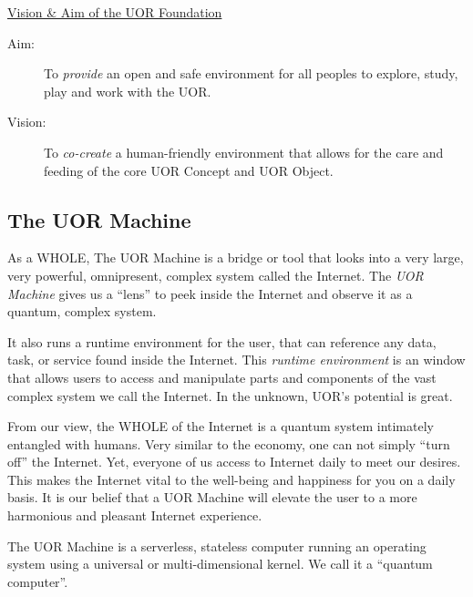 \documentclass[twocolumn,10pt]{article}
\begin{document}
\vspace{20pt}
\begin{minipage}{0.95\linewidth}
    \begin{tcolorbox}
    \begin{center}\underline{Vision \& Aim of the UOR Foundation}\end{center}
        \begin{description}
            \item[Aim:] To \textit{provide} an open and safe environment for all peoples to explore, study, play and work with the UOR\@. 
            \item[Vision:] To \textit{co-create} a human-friendly environment that allows for the care and feeding of the core UOR Concept and UOR Object. 
        \end{description}
    \end{tcolorbox}
\end{minipage}
\vspace{10pt}

\subsection*{The UOR Machine}
As a WHOLE, The UOR Machine is a bridge or tool that looks into a very large, very powerful, omnipresent, complex system called the Internet.
The \textit{UOR Machine} gives us a ``lens'' to peek inside the Internet and observe it as a quantum, complex system.

It also runs a runtime environment for the user, that can reference any data, task, or service found inside the Internet.
This \textit{runtime environment} is an window that allows users to access and manipulate parts and components of the vast complex system we call the Internet.
In the unknown, UOR's potential is great.

From our view, the WHOLE of the Internet is a quantum system intimately entangled with humans.
Very similar to the economy, one can not simply ``turn off'' the Internet.
Yet, everyone of us access to Internet daily to meet our desires.
This makes the Internet vital to the well-being and happiness for you on a daily basis.
It is our belief that a UOR Machine will elevate the user to a more harmonious and pleasant Internet experience.

The UOR Machine is a serverless, stateless computer running an operating system using a universal or multi-dimensional kernel.
We call it a ``quantum computer''.
\end{document}
